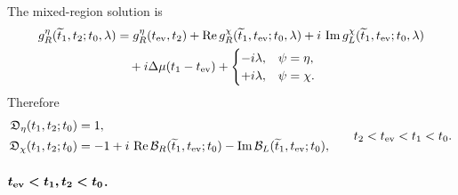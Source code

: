 \documentclass[11pt,a4paper]{article}
\begin{document}
The mixed-region solution is
\begin{equation}
\begin{aligned}
  g_R^\eta(\widetilde t_1,t_2;t_0,\lambda)
  &=
  g_R^\eta(t_{\rm ev},t_2)
  +
  \operatorname{Re}
  g_R^\chi(\widetilde t_1,t_{\rm ev};t_0,\lambda)
  +
i\,\operatorname{Im}
  g_L^\chi(\widetilde t_1,t_{\rm ev};t_0,\lambda)
  \\
  &\quad
  +
  i\Delta\mu(t_1-t_{\rm ev})
  +
  \begin{cases}
  -i\lambda,
  &
  \psi=\eta,
  \\
  +i\lambda,
  &
  \psi=\chi .
  \end{cases}
\end{aligned}
\label{eq:S4-bilocal-region-II-integrated}
\end{equation}
Therefore
\begin{equation}
\begin{aligned}
  \mathfrak D_\eta(t_1,t_2;t_0)
  &=
  1,
  \\
  \mathfrak D_\chi(t_1,t_2;t_0)
  &=
  -1
  +
  i\,\operatorname{Re}
  \mathcal B_R(\widetilde t_1,t_{\rm ev};t_0)
  -
  \operatorname{Im}
  \mathcal B_L(\widetilde t_1,t_{\rm ev};t_0),
\end{aligned}
\qquad
t_2<t_{\rm ev}<t_1<t_0 .
\label{eq:S4-bilocal-region-II-result}
\end{equation}

\paragraph*{\(\boldsymbol{t_{\rm ev}<t_1,t_2<t_0}\).}
\end{document}
